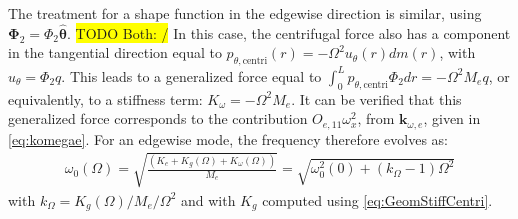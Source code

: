 \documentclass[wes, manuscript]{copernicus}
\renewcommand{\v}[1]{\boldsymbol{#1}}
\newcommand{\todoBoth}    [1]{{\colorbox{yellow}{TODO Both:    }}{\color{red}{#1}}\colorbox{yellow}{/}}
\begin{document}
The treatment for a shape function in the edgewise direction is similar, using $\v{\Phi}_2=\Phi_2 \v{\hat{\theta}}$.
\todoBoth{What ist $\v{\hat{\theta}}$?}
In this case, the centrifugal force also has a component in the tangential direction equal to $p_{\theta,\text{centri}}(r) = -\Omega^2u_\theta(r) dm(r)$, with $u_\theta=\Phi_2 q$. 
This leads to a generalized force equal to $\int_0^L p_{\theta,\text{centri}} \Phi_2 dr=-\Omega^2 M_{e} q$, or equivalently, to a stiffness term: $K_{\omega}=-\Omega^2 M_{e}$.
It can be verified that this generalized force corresponds to the contribution $O_{e,11}\omega_x^2$, from $\v{k}_{\omega,e}$, given in \autoref{eq:komegae}.
For an edgewise mode, the frequency therefore evolves as: 
\begin{align}
 \omega_0(\Omega)=\sqrt{\frac{(K_{e}+ K_g(\Omega)+K_\omega(\Omega))}{M_e}}=\sqrt{\omega_0^2(0)+(k_\Omega-1)\Omega^2}
\end{align}
 with $k_\Omega=K_g(\Omega)/M_e/\Omega^2$ and with $K_g$ computed using \autoref{eq:GeomStiffCentri}.
\end{document}
